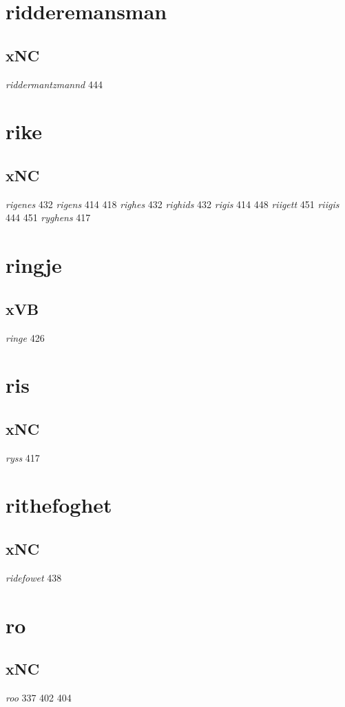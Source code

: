 \documentclass[a4paper,twocolumn]{article}
\begin{document}
\section{ridderemansman}
\label{sec:orga484c2d}
\subsection{xNC}
\label{sec:orgdd9367b}
\emph{riddermantzmannd} 444 
\section{rike}
\label{sec:orgc15b6a3}
\subsection{xNC}
\label{sec:org95ab89d}
\emph{rigenes} 432 \emph{rigens} 414 418 \emph{righes} 432 \emph{righids} 432 \emph{rigis} 414 448 \emph{riigett} 451 \emph{riigis} 444 451 \emph{ryghens} 417 
\section{ringje}
\label{sec:org75c34a0}
\subsection{xVB}
\label{sec:org145efb9}
\emph{ringe} 426 
\section{ris}
\label{sec:org811fca9}
\subsection{xNC}
\label{sec:orgb14de0a}
\emph{ryss} 417 
\section{rithefoghet}
\label{sec:org1416a2a}
\subsection{xNC}
\label{sec:org5f4b1d8}
\emph{ridefowet} 438 
\section{ro}
\label{sec:org54b1507}
\subsection{xNC}
\label{sec:orgd490ff1}
\emph{roo} 337 402 404 
\end{document}
